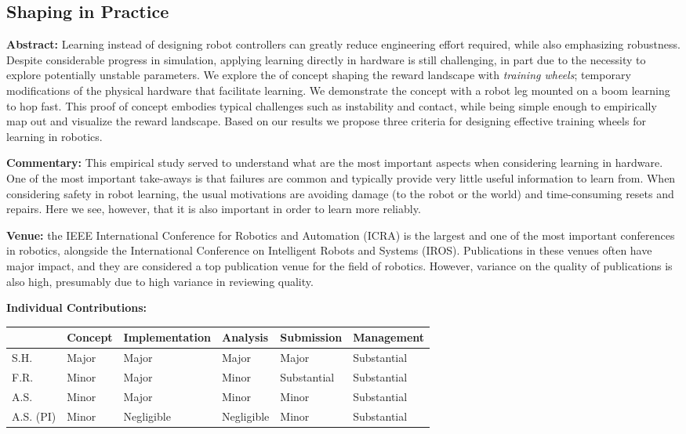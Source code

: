 \subsection{Shaping in Practice}
\textbf{Abstract: }
Learning instead of designing robot controllers can greatly reduce engineering effort required, while also emphasizing robustness. Despite considerable progress in simulation, applying learning directly in hardware is still challenging, in part due to the necessity to explore potentially unstable parameters. We explore the of concept shaping the reward landscape with \emph{training wheels}; temporary modifications of the physical hardware that facilitate learning. We demonstrate the concept with a robot leg mounted on a boom learning to hop fast. This proof of concept embodies typical challenges such as instability and contact, while being simple enough to empirically map out and visualize the reward landscape. Based on our results we propose three criteria for designing effective training wheels for learning in robotics. \par
\textbf{Commentary: }
This empirical study served to understand what are the most important aspects when considering learning in hardware. One of the most important take-aways is that failures are common and typically provide very little useful information to learn from. When considering safety in robot learning, the usual motivations are avoiding damage (to the robot or the world) and time-consuming resets and repairs. Here we see, however, that it is also important in order to learn more reliably. \par
\textbf{Venue: }
the IEEE International Conference for Robotics and Automation (ICRA) is the largest and one of the most important conferences in robotics, alongside the International Conference on Intelligent Robots and Systems (IROS). Publications in these venues often have major impact, and they are considered a top publication venue for the field of robotics. However, variance on the quality of publications is also high, presumably due to high variance in reviewing quality. \par
\textbf{Individual Contributions: }
\begin{table}[h!]
\begin{tabular}{l|l|l|l|l|l|}
\cline{2-6}
 \textbf{} & \textbf{Concept} & {\footnotesize \textbf{Implementation}} & \textbf{Analysis} & \textbf{Submission} & {\footnotesize \textbf{Management}} \\ \hline
\multicolumn{1}{|l|}{S.H.} & Major & Major & Major & Major & Substantial \\ \hline
\multicolumn{1}{|l|}{F.R.} & Minor & Major & Minor & Substantial & Substantial \\ \hline
\multicolumn{1}{|l|}{A.S.} & Minor & Major & Minor & Minor & Substantial \\ \hline
\multicolumn{1}{|l|}{A.S. (PI)} & Minor & Negligible & Negligible & Minor & Substantial \\ \hline
\end{tabular}
\end{table}

